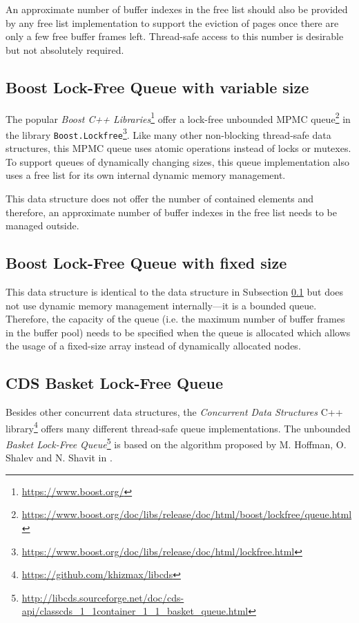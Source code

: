 	An approximate number of buffer indexes in the free list should also be provided by any free list implementation to support the eviction of pages once there are only a few free buffer frames left. Thread-safe access to this number is desirable but not absolutely required.

\subsection[Boost Lock-Free Queue with variable size]{Boost Lock-Free Queue with variable size} \label{subsec:boost}

	The popular \textit{Boost C++ Libraries}\footnote{\url{https://www.boost.org/}} offer a lock-free unbounded MPMC queue\footnote{\url{https://www.boost.org/doc/libs/release/doc/html/boost/lockfree/queue.html}} in the library \lstinline{Boost.Lockfree}\footnote{\url{https://www.boost.org/doc/libs/release/doc/html/lockfree.html}}. Like many other non-blocking thread-safe data structures, this MPMC queue uses atomic operations instead of locks or mutexes. To support queues of dynamically changing sizes, this queue implementation also uses a free list for its own internal dynamic memory management.
	
	This data structure does not offer the number of contained elements and therefore, an approximate number of buffer indexes in the free list needs to be managed outside.

\subsection[Boost Lock-Free Queue with fixed size]{Boost Lock-Free Queue with fixed size} \label{subsec:boost-fixed}

	This data structure is identical to the data structure in Subsection \ref{subsec:boost} but does not use dynamic memory management internally---it is a bounded queue. Therefore, the capacity of the queue (i.e. the maximum number of buffer frames in the buffer pool) needs to be specified when the queue is allocated which allows the usage of a fixed-size array instead of dynamically allocated nodes.

\subsection[CDS BasketQueue]{CDS Basket Lock-Free Queue} \label{subsec:cds-basket}

	Besides other concurrent data structures, the \textit{Concurrent Data Structures} C++ library\footnote{\url{https://github.com/khizmax/libcds}} offers many different thread-safe queue implementations. The unbounded \emph{Basket Lock-Free Queue}\footnote{\url{http://libcds.sourceforge.net/doc/cds-api/classcds\_1\_1container\_1\_1\_basket\_queue.html}} is based on the algorithm proposed by M. Hoffman, O. Shalev and N. Shavit in \cite{Hoffman:2007}.
	
